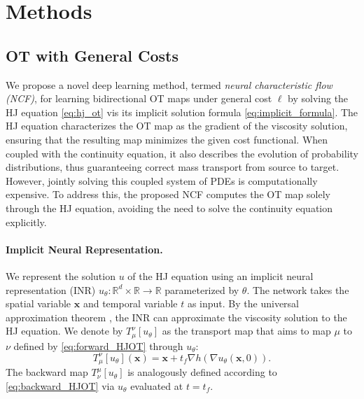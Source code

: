 \documentclass{article} %
\theoremstyle{plain}
\theoremstyle{definition}
\theoremstyle{remark}
\newcommand{\bR}{\mathbb{R}}
\newcommand{\bx}{\mathbf{x}}
\begin{document}
\section{Methods}\vspace{-0.2em}
\subsection{OT with General Costs}\vspace{-0.3em}
We propose a novel deep learning method, termed \textit{neural characteristic flow (NCF)}, for learning bidirectional OT maps under general cost $\ell$ by solving the HJ equation \eqref{eq:hj_ot} vis its implicit solution formula \eqref{eq:implicit_formula}. 
The HJ equation characterizes the OT map as the gradient of the viscosity solution, ensuring that the resulting map minimizes the given cost functional. When coupled with the continuity equation, it also describes the evolution of probability distributions, thus guaranteeing correct mass transport from source to target.
However, jointly solving this coupled system of PDEs is computationally expensive. To address this, the proposed NCF computes the OT map solely through the HJ equation, avoiding the need to solve the continuity equation explicitly.

\paragraph{Implicit Neural Representation.}
We represent the solution $u$ of the HJ equation using an implicit neural representation (INR) $u_\theta:\bR^d\times\bR\rightarrow\bR$ parameterized by $\theta$. The network takes the spatial variable $\bx$ and temporal variable $t$ as input. By the universal approximation theorem \citep{hornik1989multilayer,leshno1993multilayer}, the INR can approximate the viscosity solution to the HJ equation.
We denote by $T_\mu^\nu\left[u_\theta\right]$ as the transport map that aims to map $\mu$ to $\nu$ defined by \eqref{eq:forward_HJOT} through $u_\theta$:
\begin{equation}
    T^{\nu}_\mu\left[u_\theta\right]\left(\bx\right) = \bx + t_f\nabla h\left(\nabla u_\theta\left(\bx,0\right)\right).
\end{equation}
The backward map $T_\nu^\mu\left[u_\theta\right]$ is analogously defined according to \eqref{eq:backward_HJOT} via $u_\theta$ evaluated at $t=t_f$.
\end{document}
